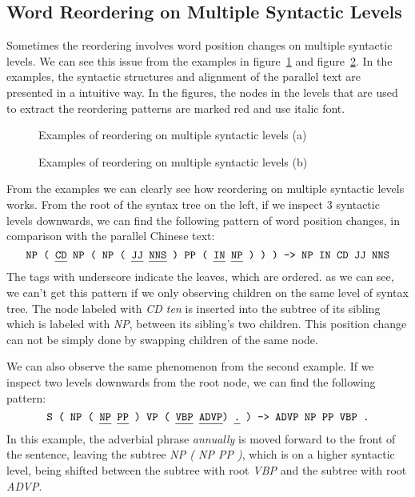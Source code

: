 \subsection{Word Reordering on Multiple Syntactic Levels}

Sometimes the reordering involves word position changes on multiple syntactic levels. We can see this issue from the examples in figure~\ref{unstructured} and figure~\ref{unstructured2}. In the examples, the syntactic structures and alignment of the parallel text are presented in a intuitive way. In the figures, the nodes in the levels that are used to extract the reordering patterns are marked red and use italic font.

\begin{figure}[H]
\centering
\scalebox{1.3}{}
\caption{Examples of reordering on multiple syntactic levels (a)}
\label{unstructured}
\end{figure}

\begin{figure}[H]
\centering
\scalebox{1.3}{}
\caption{Examples of reordering on multiple syntactic levels (b)}
\label{unstructured2}
\end{figure}

From the examples we can clearly see how reordering on multiple syntactic levels works. From the root of the syntax tree on the left, if we inspect $3$ syntactic levels downwards, we can find the following pattern of word position changes, in comparison with the parallel Chinese text:
$$\texttt{NP ( \ul{CD} NP ( NP ( \ul{JJ} \ul{NNS} ) PP ( \ul{IN} \ul{NP} ) ) ) -> NP IN CD JJ NNS}$$
The tags with underscore indicate the leaves, which are ordered. as we can see, we can't get this pattern if we only observing children on the same level of syntax tree. The node labeled with \emph{CD ten} is inserted into the subtree of its sibling which is labeled with \emph{NP}, between its sibling's two children. This position change can not be simply done by swapping children of the same node.

We can also observe the same phenomenon from the second example. If we inspect two levels downwards from the root node, we can find the following pattern:
$$\texttt{S ( NP ( \ul{NP} \ul{PP} ) VP ( \ul{VBP} \ul{ADVP}) \ul{.} ) -> ADVP NP PP VBP .}$$
In this example, the adverbial phrase \emph{annually} is moved forward to the front of the sentence, leaving the subtree \emph{NP ( NP PP )}, which is on a higher syntactic level, being shifted between the subtree with root \emph{VBP} and the subtree with root \emph{ADVP}.

